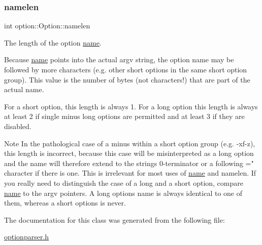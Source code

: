 \subsubsection{\texorpdfstring{namelen}{namelen}}
{\footnotesize\ttfamily int option\+::\+Option\+::namelen}



The length of the option \hyperlink{classoption_1_1_option_a02a76b4896abd22d0ba8514362261de9}{name}. 

Because \hyperlink{classoption_1_1_option_a02a76b4896abd22d0ba8514362261de9}{name} points into the actual {\ttfamily argv} string, the option name may be followed by more characters (e.\+g. other short options in the same short option group). This value is the number of bytes (not characters!) that are part of the actual name.

For a short option, this length is always 1. For a long option this length is always at least 2 if single minus long options are permitted and at least 3 if they are disabled.

\begin{DoxyNote}{Note}
In the pathological case of a minus within a short option group (e.\+g. {\ttfamily -\/xf-\/z}), this length is incorrect, because this case will be misinterpreted as a long option and the name will therefore extend to the string\textquotesingle{}s 0-\/terminator or a following \textquotesingle{}=" character if there is one. This is irrelevant for most uses of \hyperlink{classoption_1_1_option_a02a76b4896abd22d0ba8514362261de9}{name} and {\ttfamily namelen}. If you really need to distinguish the case of a long and a short option, compare \hyperlink{classoption_1_1_option_a02a76b4896abd22d0ba8514362261de9}{name} to the {\ttfamily argv} pointers. A long option\textquotesingle{}s {\ttfamily name} is always identical to one of them, whereas a short option\textquotesingle{}s is never. 
\end{DoxyNote}


The documentation for this class was generated from the following file\+:\begin{DoxyCompactItemize}
\item 
\hyperlink{optionparser_8h}{optionparser.\+h}\end{DoxyCompactItemize}
